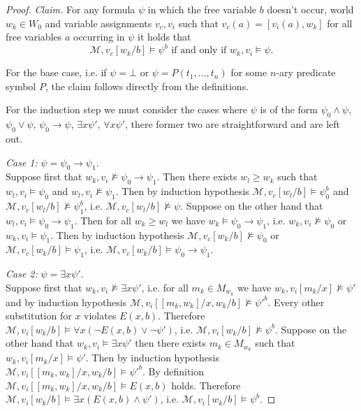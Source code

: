 \documentclass{easychair}
\theoremstyle{definition}
\theoremstyle{definition}
\theoremstyle{definition}
\theoremstyle{definition}
\theoremstyle{definition}
\theoremstyle{definition}
\theoremstyle{definition}
\begin{document}
\begin{proof}
	\emph{Claim.} For any formula $\psi$ in which the free variable $b$ doesn't occur, world $w_k\in W_0$ and variable assignments $v_c, v_i$ such that $v_c(a) = [v_i(a), w_k]$ for all free variables $a$ occurring in $\psi$ it holds that
\[\mathcal M, v_c[w_k/b]\models \psi^b\text{ if and only if $w_k, v_i\models \psi$.}\]
	
	For the base case, i.e. if $\psi = \bot$ or $\psi = P(t_1,\dots, t_n)$ for some $n$-ary predicate symbol $P$, the claim follows directly from the definitions.
	
	For the induction step we must consider the cases where $\psi$ is of the form $\psi_0\wedge \psi$, $\psi_0\vee \psi$, $\psi_0\to \psi$, $\exists x\psi'$, $\forall x \psi'$, there former two are straightforward and are left out.

	\emph{Case 1:} $\psi = \psi_0\to \psi_1$.\\
	Suppose first that $w_k, v_i\not\models \psi_0\to\psi_1$. Then there exists $w_l\geq w_k$ such that $w_l, v_i\models \psi_0$ and $w_l, v_i\not\models\psi_1$. Then by induction hypothesis $\mathcal M, v_c[w_l/b]\models \psi_0^b$ and $\mathcal M, v_c[w_l/b]\not\models \psi_1^b$, i.e. $\mathcal M, v_c[w_l/b]\not\models \psi$. Suppose on the other hand that $w_l, v_i\models \psi_0\to\psi_1$. Then for all $w_k\geq w_l$ we have $w_k\models \psi_0\to \psi_1$, i.e. $w_k, v_i\not\models\psi_0$ or $w_k, v_i\models\psi_1$. Then by induction hypothesis $\mathcal M, v_c[w_k/b]\not\models\psi_0$ or $\mathcal M, v_c[w_k/b]\models\psi_1$, i.e. $\mathcal M, v_c[w_k/b]\models \psi_0\to\psi_1$.

	\emph{Case 2:} $\psi = \exists x\psi'$.\\
	Suppose first that $w_k, v_i\not\models\exists x\psi'$, i.e. for all $m_k\in M_{w_k}$ we have $w_k, v_i[m_k/x]\not\models \psi'$ and by induction hypothesis $\mathcal M, v_i[[m_k, w_k]/x, w_k/b]\not\models \psi'^b$. Every other substitution for $x$ violates $E(x, b)$. Therefore $\mathcal M, v_i[w_k/b]\models \forall x(\neg E(x, b)\vee \neg \psi')$, i.e. $\mathcal M, v_i[w_k/b]\not\models \psi^b$. Suppose on the other hand that $w_k, v_i\models \exists x\psi'$ then there exists $m_k\in M_{w_k}$ such that $w_k, v_i[m_k/x]\models\psi'$. Then by induction hypothesis $\mathcal M, v_i[[m_k, w_k]/x, w_k/b]\models \psi'^b$. By definition $\mathcal M, v_i[[m_k, w_k]/x, w_k/b]\models E(x, b)$ holds. Therefore $\mathcal M, v_i[w_k/b]\models \exists x(E(x, b)\wedge \psi')$, i.e. $\mathcal M, v_i[w_k/b]\models \psi^b$.


\end{proof}
\end{document}

